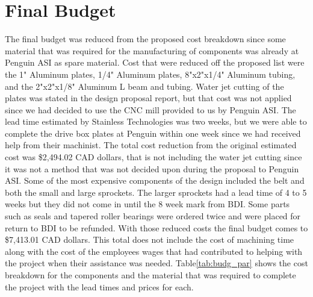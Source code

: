 

\section{Final Budget}
The final budget was reduced from the proposed cost breakdown since some material that was required for the manufacturing of components was already at Penguin ASI as spare material. Cost that were reduced off the proposed list were the 1" Aluminum plates, 1/4" Aluminum plates, 8"x2"x1/4" Aluminum tubing, and the 2"x2"x1/8" Aluminum L beam and tubing. Water jet cutting of the plates was stated in the design proposal report, but that cost was not applied since we had decided to use the CNC mill provided to us by Penguin ASI. The lead time estimated by Stainless Technologies was two weeks, but we were able to complete the drive box plates at Penguin within one week since we had received help from their machinist. The total cost reduction from the original estimated cost was \$2,494.02 CAD dollars, that is not including the water jet cutting since it was not a method that was not decided upon during the proposal to Penguin ASI. Some of the most expensive components of the design included the belt and both the small and large sprockets. The larger sprockets had a lead time of 4 to 5 weeks but they did not come in until the 8 week mark from BDI. Some parts such as seals and tapered roller bearings were ordered twice and were placed for return to BDI to be refunded. With those reduced costs the final budget comes to \$7,413.01 CAD dollars. This total does not include the cost of machining time along with the cost of the employees wages that had contributed to helping with the project when their assistance was needed. Table\ref{tab:budg_par} shows the cost breakdown for the components and the material that was required to complete the project with the lead times and prices for each.

